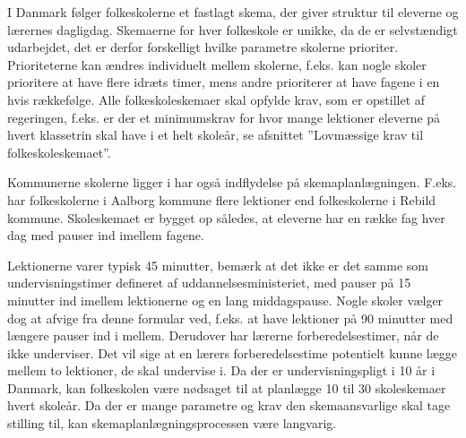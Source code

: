 I Danmark følger folkeskolerne et fastlagt skema, der giver struktur til eleverne og lærernes dagligdag. Skemaerne for hver folkeskole er unikke, da de er selvstændigt udarbejdet, det er derfor forskelligt hvilke parametre skolerne prioriter. Prioriteterne kan ændres individuelt mellem skolerne, f.eks. kan nogle skoler prioritere at have flere idræts timer, mens andre prioriterer at have fagene i en hvis rækkefølge. Alle folkeskoleskemaer skal opfylde krav, som er opstillet af regeringen, f.eks. er der et minimumskrav for hvor mange lektioner eleverne på hvert klassetrin skal have i et helt skoleår, se afsnittet ”Lovmæssige krav til folkeskoleskemaet”. 

Kommunerne skolerne ligger i har også indflydelse på skemaplanlægningen. F.eks. har folkeskolerne i Aalborg kommune flere lektioner end folkeskolerne i Rebild kommune. Skoleskemaet er bygget op således, at eleverne har en række fag hver dag med pauser ind imellem fagene. 

Lektionerne varer typisk 45 minutter, bemærk at det ikke er det samme som undervisningstimer defineret af uddannelsesministeriet, med pauser på 15 minutter ind imellem lektionerne og en lang middagspause. Nogle skoler vælger dog at afvige fra denne formular ved, f.eks. at have lektioner på 90 minutter med længere pauser ind i mellem. Derudover har lærerne forberedelsestimer, når de ikke underviser. Det vil sige at en lærers forberedelsestime potentielt kunne lægge mellem to lektioner, de skal undervise i. Da der er undervisningspligt i 10 år i Danmark, kan folkeskolen være nødsaget til at planlægge 10 til 30 skoleskemaer hvert skoleår. Da der er mange parametre og krav den skemaansvarlige skal tage stilling til, kan skemaplanlægningsprocessen være langvarig.